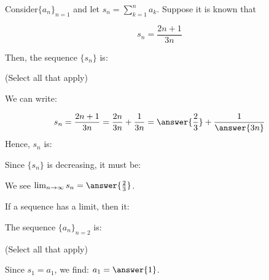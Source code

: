 \documentclass{ximera}
\author{Jim Talamo}
\begin{document}
\begin{exercise}
Consider$\{a_n \}_{n=1}$ and let $s_n = \sum_{k=1}^{n} a_k$.  Suppose it is known that

\[
s_n = \frac{2n+1}{3n}
\]

Then, the sequence $\{s_n\}$ is:

\begin{selectAll}
\end{selectAll}
(Select all that apply)

\begin{hint}
We can write:

\[
s_n = \frac{2n+1}{3n} = \frac{2n}{3n}+\frac{1}{3n} = \answer{\frac{2}{3}}+\frac{1}{\answer{3n}}
\]
Hence, $s_n$ is:

\begin{multipleChoice}
\end{multipleChoice}

\begin{question}
Since $\{s_n\}$ is decreasing, it must be:
\begin{multipleChoice}
\end{multipleChoice}

\begin{question}
We see $\lim_{n \to \infty} s_n = \answer{\frac{2}{3}}$.

If a sequence has a limit, then it:
\begin{multipleChoice}
\end{multipleChoice}

\end{question}
\end{question}

\end{hint}

The sequence $\{a_n \}_{n=2}$ is:
\begin{selectAll}
\end{selectAll}
(Select all that apply)

\begin{hint}
Since $s_1=a_1$, we find: $a_1 = \answer{1}$.


\end{hint}
\end{exercise}
\end{document}
